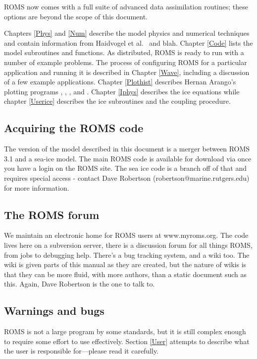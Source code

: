 ROMS now comes with a full suite of advanced data assimilation
routines; these options are beyond the scope of this document.

Chapters \ref{Phys} and \ref{Num} describe the model physics and
numerical techniques and contain information from Haidvogel et al.\
\cite{Haidvogel07} and blah.
Chapter \ref{Code} lists the model subroutines and functions.
As distributed, ROMS is ready to run with a number of example problems.
The process of configuring ROMS for a particular application and
running it is
described in Chapter \ref{Wave}, including a discussion of a few example
applications.
Chapter \ref{Plothist} describes Hernan Arango's plotting
programs , , , and .
Chapter \ref{Iphys} describes the ice equations while chapter
\ref{Userice} describes the ice subroutines and the coupling procedure.

\subsection{Acquiring the ROMS code}
\label{Svn}
The version of the model described in this document is a merger between
ROMS 3.1 and a sea-ice model. The main ROMS code is available for
download via \code{svn} once you have a login on the ROMS site. The sea ice
code is a branch off of that and requires special access - contact
Dave Robertson (robertson@marine.rutgers.edu) for more information.

\subsection{The ROMS forum}
We maintain an electronic home for ROMS users at www.myroms.org.
The code lives here on a subversion server, there is a discussion
forum for all things ROMS, from jobs to debugging help. There's a
bug tracking system, and a wiki too. The wiki is given parts of
this manual as they are created, but the nature of wikis is that
they can be more fluid, with more authors, than a static document such
as this. Again, Dave Robertson is the one to talk to.

\subsection{Warnings and bugs}
ROMS is not a large program by some standards, but it is still complex
enough to require some effort to use effectively.  Section \ref{User}
attempts to describe what the user is responsible for---please read
it carefully.

